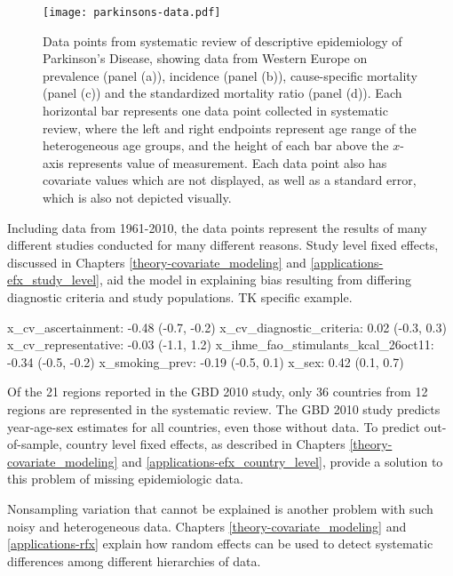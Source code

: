     \begin{figure}[h]
        \begin{center}
            \texttt{[image: parkinsons-data.pdf]}
            \caption{Data points from systematic review of descriptive
              epidemiology of Parkinson's Disease, showing data from
              Western Europe on prevalence (panel (a)), incidence
              (panel (b)), cause-specific mortality (panel (c)) and
              the standardized mortality ratio (panel (d)).  Each
              horizontal bar represents one data point collected in
              systematic review, where the left and right endpoints
              represent age range of the heterogeneous age groups, and
              the height of each bar above the $x$-axis represents
              value of measurement.  Each data point also has
              covariate values which are not displayed, as well as a
              standard error, which is also not depicted visually.}
            \label{fig:intro-parkinsons data}
        \end{center}
    \end{figure}

Including data from 1961-2010, the data points represent the results
of many different studies conducted for many different reasons.  Study
level fixed effects, discussed in Chapters
\ref{theory-covariate_modeling} and
\ref{applications-efx_study_level}, aid the model in explaining bias
resulting from differing diagnostic criteria and study populations. TK
specific example.

x_cv_ascertainment: -0.48 (-0.7, -0.2)
x_cv_diagnostic_criteria: 0.02 (-0.3, 0.3)
x_cv_representative: -0.03 (-1.1, 1.2)
x_ihme_fao_stimulants_kcal_26oct11: -0.34 (-0.5, -0.2)
x_smoking_prev: -0.19 (-0.5, 0.1)
x_sex: 0.42 (0.1, 0.7)

Of the 21 regions reported in the GBD 2010 study, only 36 countries
from 12 regions are represented in the systematic review.  The GBD
2010 study predicts year-age-sex estimates for all countries, even
those without data.  To predict out-of-sample, country level fixed
effects, as described in Chapters \ref{theory-covariate_modeling} and
\ref{applications-efx_country_level}, provide a solution to this
problem of missing epidemiologic data.

Nonsampling variation that cannot be explained is another problem with
such noisy and heterogeneous data.  Chapters
\ref{theory-covariate_modeling} and \ref{applications-rfx} explain how
random effects can be used to detect systematic differences among
different hierarchies of data.

